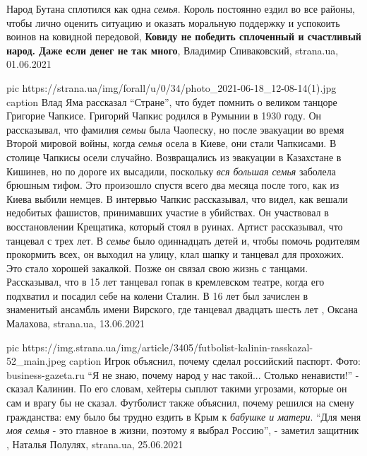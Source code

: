  
 
 
 
 


Народ Бутана сплотился как одна \emph{семья}. Король постоянно ездил во все районы,
чтобы лично оценить ситуацию и оказать моральную поддержку и успокоить воинов
на ковидной передовой, \textbf{Ковиду не победить сплоченный и счастливый
народ. Даже если денег не так много}, Владимир Спиваковский, strana.ua,
01.06.2021

\ifcmt
  pic https://strana.ua/img/forall/u/0/34/photo_2021-06-18_12-08-14(1).jpg
	caption Влад Яма рассказал \enquote{Стране}, что будет помнить о великом танцоре Григорие Чапкисе.
\fi
Григорий Чапкис родился в Румынии в 1930 году. Он рассказывал, что фамилия
\emph{семьи} была Чаопеску, но после эвакуации во время Второй мировой войны,
когда \emph{семья} осела в Киеве, они стали Чапкисами.  В столице Чапкисы осели
случайно.  Возвращались из эвакуации в Казахстане в Кишинев, но по дороге их
высадили, поскольку \emph{вся большая семья} заболела брюшным тифом. Это
произошло спустя всего два месяца после того, как из Киева выбили немцев. В
интервью Чапкис рассказывал, что видел, как вешали недобитых фашистов,
принимавших участие в убийствах. Он участвовал в восстановлении Крещатика,
который стоял в руинах.  Артист рассказывал, что танцевал с трех лет. В
\emph{семье} было одиннадцать детей и, чтобы помочь родителям прокормить всех,
он выходил на улицу, клал шапку и танцевал для прохожих. Это стало хорошей
закалкой.  Позже он связал свою жизнь с танцами. Рассказывал, что в 15 лет
танцевал гопак в кремлевском театре, когда его подхватил и посадил себе на
колени Сталин.  В 16 лет был зачислен в знаменитый ансамбль имени Вирского, где
танцевал двадцать шесть лет
, 
Оксана Малахова, strana.ua, 13.06.2021

\ifcmt
  pic https://img.strana.ua/img/article/3405/futbolist-kalinin-rasskazal-52_main.jpeg
	caption Игрок объяснил, почему сделал российский паспорт. Фото: business-gazeta.ru
\fi
\enquote{Я не знаю, почему народ у нас такой... Столько ненависти!} - сказал Калинин.
По его словам, хейтеры сыплют такими угрозами, которые он сам и врагу бы не
сказал. Футболист также объяснил, почему решился на смену гражданства: ему
было бы трудно ездить в Крым к \emph{бабушке и матери}.  \enquote{Для меня \emph{моя семья} - это
главное в жизни, поэтому я выбрал Россию}, - заметил защитник
, 
Наталья Полулях, strana.ua, 25.06.2021

